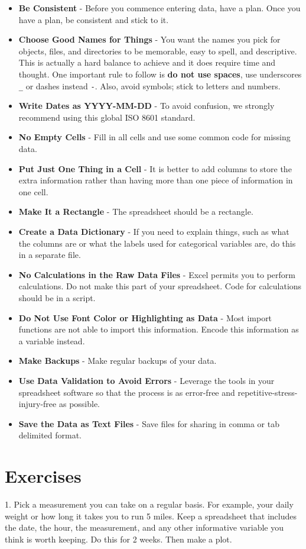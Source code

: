\documentclass[
]{krantz}
\providecommand{\tightlist}{%
  \setlength{\itemsep}{0pt}\setlength{\parskip}{0pt}}
\begin{document}
\begin{itemize}
\tightlist
\item
  \textbf{Be Consistent} - Before you commence entering data, have a plan. Once you have a plan, be consistent and stick to it.
\item
  \textbf{Choose Good Names for Things} - You want the names you pick for objects, files, and directories to be memorable, easy to spell, and descriptive. This is actually a hard balance to achieve and it does require time and thought. One important rule to follow is \textbf{do not use spaces}, use underscores \texttt{\_} or dashes instead \texttt{-}. Also, avoid symbols; stick to letters and numbers.
\item
  \textbf{Write Dates as YYYY-MM-DD} - To avoid confusion, we strongly recommend using this global ISO 8601 standard.
\item
  \textbf{No Empty Cells} - Fill in all cells and use some common code for missing data.
\item
  \textbf{Put Just One Thing in a Cell} - It is better to add columns to store the extra information rather than having more than one piece of information in one cell.
\item
  \textbf{Make It a Rectangle} - The spreadsheet should be a rectangle.
\item
  \textbf{Create a Data Dictionary} - If you need to explain things, such as what the columns are or what the labels used for categorical variables are, do this in a separate file.
\item
  \textbf{No Calculations in the Raw Data Files} - Excel permits you to perform calculations. Do not make this part of your spreadsheet. Code for calculations should be in a script.
\item
  \textbf{Do Not Use Font Color or Highlighting as Data} - Most import functions are not able to import this information. Encode this information as a variable instead.
\item
  \textbf{Make Backups} - Make regular backups of your data.
\item
  \textbf{Use Data Validation to Avoid Errors} - Leverage the tools in your spreadsheet software so that the process is as error-free and repetitive-stress-injury-free as possible.
\item
  \textbf{Save the Data as Text Files} - Save files for sharing in comma or tab delimited format.
\end{itemize}

\hypertarget{exercises-14}{%
\section{Exercises}\label{exercises-14}}

1. Pick a measurement you can take on a regular basis. For example, your daily weight or how long it takes you to run 5 miles. Keep a spreadsheet that includes the date, the hour, the measurement, and any other informative variable you think is worth keeping. Do this for 2 weeks. Then make a plot.

  
\end{document}
